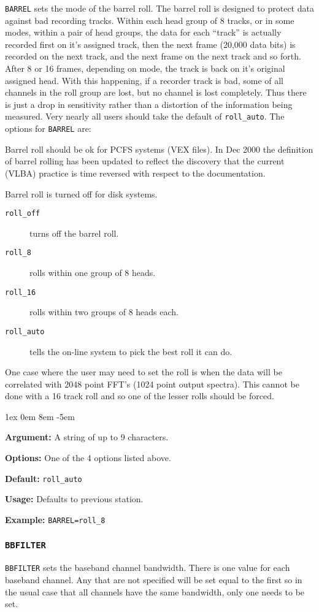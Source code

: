 \documentclass{report}
\newcommand{\rcwbox}[5]{
  \begin{list}{}{\parsep 1ex  \itemsep 0em
                 \leftmargin 8em  \itemindent -5em }
    \item {\bf Argument:} #1
    \item {\bf Options:}  #2
    \item {\bf Default:}  #3
    \item {\bf Usage:}    #4
    \item {\bf Example:}  #5
  \end{list}
}
\begin{document}
{\tt BARREL} sets the mode of the barrel roll.  The barrel roll is
designed to protect data against bad recording tracks.  Within each
head group of 8 tracks, or in some modes, within a pair of head
groups, the data for each ``track'' is actually recorded first
on it's assigned track, then the next frame (20,000 data bits)
is recorded on the next track, and the next frame on the next track
and so forth.  After 8 or 16 frames, depending on mode, the track
is back on it's original assigned head.  With this happening, if
a recorder track is bad, some of all channels in the roll group
are lost, but no channel is lost completely.  Thus there is just
a drop in sensitivity rather than a distortion of the information
being measured.  Very nearly all users should take the default
of {\tt roll\_auto}.  The options for {\tt BARREL} are:

Barrel roll should be ok for PCFS systems (VEX files).  In Dec
2000 the definition of barrel rolling has been updated to reflect the
discovery that the current (VLBA) practice is time reversed with
respect to the documentation.

Barrel roll is turned off for disk systems.

\begin{description}
\item[{\tt roll\_off}] turns off the barrel roll.
\item[{\tt roll\_8}] rolls within one group of 8 heads.
\item[{\tt roll\_16}] rolls within two groups of 8 heads each.
\item[{\tt roll\_auto}] tells the on-line system to pick the best
                      roll it can do.
\end{description}
One case where the user may need to set the roll is when the data
will be correlated with 2048 point FFT's (1024 point output spectra).
This cannot be done with a 16 track roll and so one of the lesser
rolls should be forced.

\rcwbox
{A string of up to 9 characters.}
{One of the 4 options listed above.}
{{\tt roll\_auto}}
{Defaults to previous station.}
{{\tt BARREL=roll\_8}}

\subsubsection{\label{SP:BBFILTER}{\tt BBFILTER}}

{\tt BBFILTER} sets the baseband channel bandwidth.  There is one
value for each baseband channel.  Any that are not specified will be
set equal to the first so in the usual case that all channels have the
same bandwidth, only one needs to be set.
\end{document}
